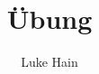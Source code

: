 \documentclass[a4paper, 12pt] {article} %
\title{Übung}
\begin{document}
\maketitle
\author{Luke Hain}
\tableofcontents{}


  

%

%

%

%

%
\end{document}
